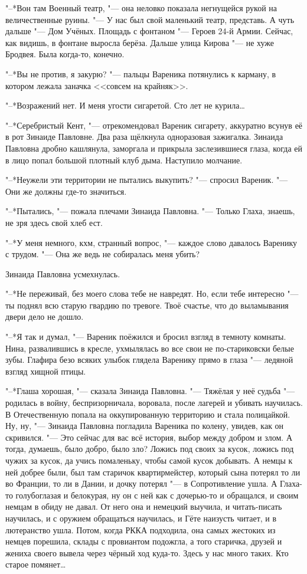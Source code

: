 "--*Вон там Военный театр, "--- она неловко показала негнущейся рукой на величественные руины.
"--- У нас был свой маленький театр, представь.
А чуть дальше "--- Дом Учёных.
Площадь с фонтаном "--- Героев 24-й Армии.
Сейчас, как видишь, в фонтане выросла берёза.
Дальше улица Кирова "--- не хуже Бродвея.
Была когда-то, конечно.

"--*Вы не против, я закурю? "--- пальцы Вареника потянулись к карману, в котором лежала заначка <<совсем на крайняк>>.

"--*Возражений нет.
И меня угости сигаретой.
Сто лет не курила\dots{}

"--*Серебристый Кент, "--- отрекомендовал Вареник сигарету, аккуратно всунув её в рот Зинаиде Павловне.
Два раза щёлкнула одноразовая зажигалка.
Зинаида Павловна дробно кашлянула, заморгала и прикрыла заслезившиеся глаза, когда ей в лицо попал большой плотный клуб дыма.
Наступило молчание.

"--*Неужели эти территории не пытались выкупить? "--- спросил Вареник.
"--- Они же должны где-то значиться.

"--*Пытались, "--- пожала плечами Зинаида Павловна.
"--- Только Глаха, знаешь, не зря здесь свой хлеб ест.

"--*У меня немного, кхм, странный вопрос, "--- каждое слово давалось Варенику с трудом.
"--- Она же ведь не собиралась меня убить?

Зинаида Павловна усмехнулась.

"--*Не переживай, без моего слова тебе не навредят.
Но, если тебе интересно "--- ты поднял всю старую гвардию по тревоге.
Твоё счастье, что до выламывания двери дело не дошло.

"--*Я так и думал, "--- Вареник поёжился и бросил взгляд в темноту комнаты.
Нина, развалившись в кресле, ухмылялась во все свои не по-стариковски белые зубы.
Глафира безо всяких улыбок глядела Варенику прямо в глаза "--- ледяной взгляд хищной птицы.

"--*Глаша хорошая, "--- сказала Зинаида Павловна.
"--- Тяжёлая у неё судьба "--- родилась в войну, беспризорничала, воровала, после лагерей и убивать научилась.
В Отечественную попала на оккупированную территорию и стала полицайкой.
Ну, ну, "--- Зинаида Павловна погладила Вареника по колену, увидев, как он скривился.
"--- Это сейчас для вас всё история, выбор между добром и злом.
А тогда, думаешь, было добро, было зло?
Ложись под своих за кусок, ложись под чужих за кусок, да учись помаленьку, чтобы самой кусок добывать.
А немцы к ней добрее были, был там старичок квартирмейстер, который сына потерял то ли во Франции, то ли в Дании, и дочку потерял "--- в Сопротивление ушла.
А Глаха-то голубоглазая и белокурая, ну он с ней как с дочерью-то и обращался, и своим немцам в обиду не давал.
От него она и немецкий выучила, и читать-писать научилась, и с оружием обращаться научилась, и Гёте наизусть читает, и в лютеранство ушла.
Потом, когда РККА подходила, она самых жестоких из немцев порешила, склады с провиантом подожгла, а того старичка, друзей и жениха своего вывела через чёрный ход куда-то.
Здесь у нас много таких.
Кто старое помянет\dots{}

